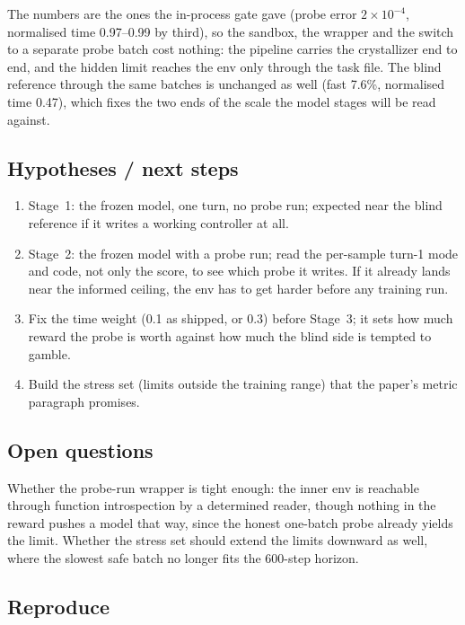 \documentclass[11pt,a4paper]{article}
\begin{document}
The numbers are the ones the in-process gate gave (probe error
$2\times10^{-4}$, normalised time 0.97--0.99 by third), so the sandbox, the
wrapper and the switch to a separate probe batch cost nothing: the pipeline
carries the crystallizer end to end, and the hidden limit reaches the env
only through the task file. The blind reference through the same batches is
unchanged as well (fast 7.6\%, normalised time 0.47), which fixes the two
ends of the scale the model stages will be read against.

\subsection*{Hypotheses / next steps}

\begin{enumerate}[nosep]
\item Stage~1: the frozen model, one turn, no probe run; expected near the
  blind reference if it writes a working controller at all.
\item Stage~2: the frozen model with a probe run; read the per-sample turn-1
  mode and code, not only the score, to see which probe it writes. If it
  already lands near the informed ceiling, the env has to get harder before
  any training run.
\item Fix the time weight (0.1 as shipped, or 0.3) before Stage~3; it sets
  how much reward the probe is worth against how much the blind side is
  tempted to gamble.
\item Build the stress set (limits outside the training range) that the
  paper's metric paragraph promises.
\end{enumerate}

\subsection*{Open questions}

Whether the probe-run wrapper is tight enough: the inner env is reachable
through function introspection by a determined reader, though nothing in the
reward pushes a model that way, since the honest one-batch probe already
yields the limit. Whether the stress set should extend the limits downward
as well, where the slowest safe batch no longer fits the 600-step horizon.

\subsection*{Reproduce}
\end{document}
